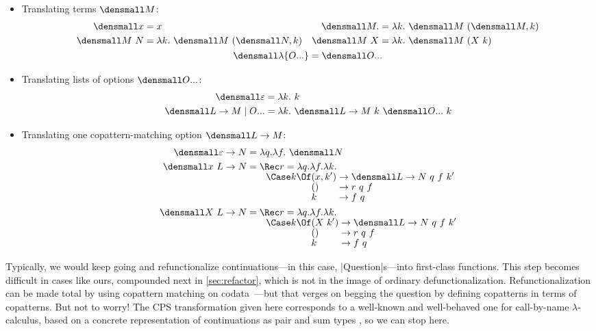 \documentclass[sigplan,screen]{acmart}
\begin{document}
\begin{itemize}
\item  Translating terms $\den{M}$:
\begin{gather*}
\begin{aligned}
  \den{x} &= x
  &
  \den{M.} &= \lambda k.~ \den{M} ~ (\den{M}, k)
  \\
  \den{M~N} &= \lambda k.~ \den{M} ~ (\den{N}, k)
  &
  \den{M~X} &= \lambda k.~ \den{M} ~ (X ~ k)
\end{aligned}
  \\
  \den{\lambda\{\many{O}\}} = \den{\many{O}}
\end{gather*}
\item  Translating lists of options $\den{\many{O}}$:
\begin{align*}
  \den{\varepsilon} &= \lambda k.~ k
  \\
  \den{L \to M \mid \many{O}}
  &=
  \lambda k.~ \den{L \to M} ~ k ~ \den{\many{O}} ~ k
\end{align*}
\item Translating one copattern-matching option $\den{L \to M}$:
\begin{align*}
  \den{\varepsilon \to N} &= \lambda q. \lambda f.~ \den{N}
  \\
  \den{x ~ L \to N} &= \Rec r = \lambda q. \lambda f. \lambda k.
  \\[-1ex]
  &\qquad
  \Case k \Of
  \begin{alignedat}[t]{2}
    &(x, k') &&\to \den{L \to N} ~ q ~ f ~ k'
    \\[-1ex]
    &() &&\to r ~ q ~ f
    \\[-1ex]
    &k &&\to f ~ q
  \end{alignedat}
  \\
  \den{X ~ L \to N} &= \Rec r = \lambda q. \lambda f. \lambda k.
  \\[-1ex]
  &\qquad
  \Case k \Of
  \begin{alignedat}[t]{2}
    &(X ~ k') &&\to \den{L \to N} ~ q ~ f ~ k'
    \\[-1ex]
    &() &&\to r ~ q ~ f
    \\[-1ex]
    &k &&\to f ~ q
  \end{alignedat}
\end{align*}
\end{itemize}

\begin{remark}
  Typically, we would keep going and refunctionalize continuations---in this
  case, \hs|Question|s---into first-class functions.  This step becomes
  difficult in cases like ours, compounded next in \cref{sec:refactor}, which is
  not in the image of ordinary defunctionalization.  Refunctionalization can be
  made total by using copattern matching on
  codata~\cite{RefunctionalizationCopatterns}---but that verges on begging the
  question by defining copatterns in terms of copatterns.  But not to worry!
  The CPS transformation given here corresponds to a well-known and well-behaved
  one for call-by-name $\lambda$-calculus, based on a concrete representation of
  continuations as pair and sum types
  \cite{ContinuationModels,ClassicalLogicContinuationSemantics,CBNSyntacticCPS,AnswerTypePolyEta},
  so we can stop here.
\end{remark}
\end{document}
